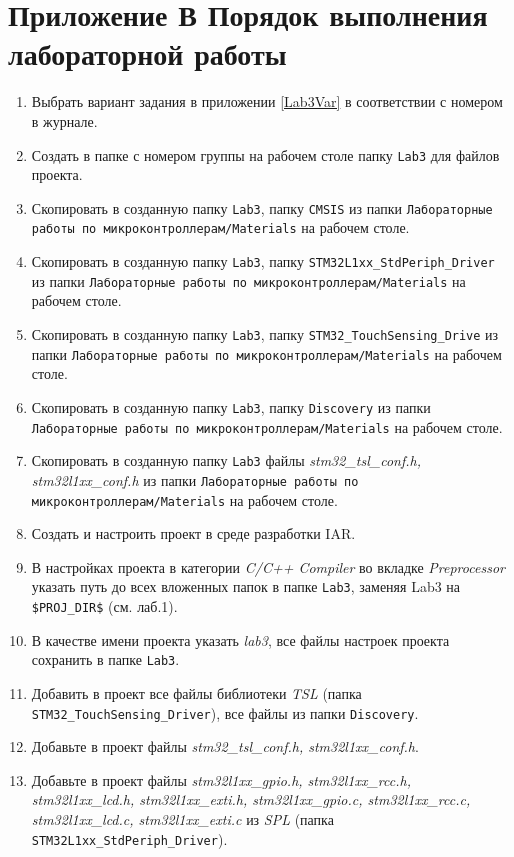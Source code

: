 \chapter*{Приложение В Порядок выполнения лабораторной работы }
\begin{enumerate}
\item Выбрать вариант задания в приложении \ref{Lab3Var} в соответствии с номером в журнале.
\item Создать в папке с номером группы на рабочем столе папку \verb#Lab3# для файлов проекта.
\item Скопировать в созданную папку \verb#Lab3#, папку  \verb#CMSIS# из папки  \verb#Лабораторные работы по микроконтроллерам/Materials# на рабочем столе.
\item Скопировать в созданную папку \verb#Lab3#, папку  \verb#STM32L1xx_StdPeriph_Driver# из папки  \verb#Лабораторные работы по микроконтроллерам/Materials# на рабочем столе.
\item Скопировать в созданную папку \verb#Lab3#, папку  \verb#STM32_TouchSensing_Drive# из папки  \verb#Лабораторные работы по микроконтроллерам/Materials# на рабочем столе.
\item Скопировать в созданную папку \verb#Lab3#, папку  \verb#Discovery# из папки  \verb#Лабораторные работы по микроконтроллерам/Materials# на рабочем столе.
\item Скопировать в созданную папку \verb#Lab3# файлы \textit{stm32\_tsl\_conf.h, stm32l1xx\_conf.h} из папки  \verb#Лабораторные работы по микроконтроллерам/Materials# на рабочем столе.
\item Создать и настроить проект в среде разработки IAR.
\item В настройках проекта в категории \textit{C/C++ Compiler} во вкладке \textit{Preprocessor} указать путь до всех вложенных папок в папке \verb#Lab3#, заменяя Lab3 на \verb#$PROJ_DIR$# (см. лаб.1).
\item В качестве имени проекта указать \textit{lab3}, все файлы настроек проекта сохранить в папке \verb#Lab3#.
\item Добавить в проект все файлы библиотеки \textit{TSL} (папка \verb#STM32_TouchSensing_Driver#), все файлы из папки \verb#Discovery#.
\item Добавьте в проект файлы \textit{stm32\_tsl\_conf.h, stm32l1xx\_conf.h}.
\item Добавьте в проект файлы \textit{stm32l1xx\_gpio.h, stm32l1xx\_rcc.h, stm32l1xx\_lcd.h, stm32l1xx\_exti.h, stm32l1xx\_gpio.c, stm32l1xx\_rcc.c, stm32l1xx\_lcd.c, stm32l1xx\_exti.c} из \textit{SPL} (папка \verb#STM32L1xx_StdPeriph_Driver#).

\end{enumerate}
